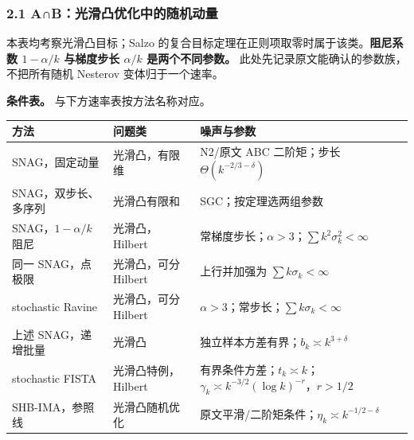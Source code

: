 \documentclass[
  chinese,
  10pt,
  a4paper,
]{article}
\newcounter{none} %
\begin{document}
\subsubsection{2.1
A∩B：光滑凸优化中的随机动量}\label{abux5149ux6ed1ux51f8ux4f18ux5316ux4e2dux7684ux968fux673aux52a8ux91cf}

本表均考察光滑凸目标；Salzo
的复合目标定理在正则项取零时属于该类。\textbf{阻尼系数 \(1-\alpha/k\)
与梯度步长 \(\alpha/k\) 是两个不同参数。}
此处先记录原文能确认的参数族，不把所有随机 Nesterov 变体归于一个速率。

\textbf{条件表。} 与下方速率表按方法名称对应。

{\def\LTcaptype{none} %
\begin{longtable}[]{@{}
  >{\raggedright\arraybackslash}p{}
  >{\raggedright\arraybackslash}p{}
  >{\raggedright\arraybackslash}p{}@{}}
\toprule\noalign{}
\begin{minipage}[b]{\linewidth}\raggedright
方法
\end{minipage} & \begin{minipage}[b]{\linewidth}\raggedright
问题类
\end{minipage} & \begin{minipage}[b]{\linewidth}\raggedright
噪声与参数
\end{minipage} \\
\midrule\noalign{}
\endhead
\bottomrule\noalign{}
\endlastfoot
SNAG，固定动量 & 光滑凸，有限维 & N2/原文 ABC 二阶矩；步长
\(\Theta(k^{-2/3-\delta})\) \\
SNAG，双步长、多序列 & 光滑凸有限和 & SGC；按定理选两组参数 \\
SNAG，\(1-\alpha/k\) 阻尼 & 光滑凸，Hilbert &
常梯度步长；\(\alpha>3\)；\(\sum k^2\sigma_k^2<\infty\) \\
同一 SNAG，点极限 & 光滑凸，可分 Hilbert & 上行并加强为
\(\sum k\sigma_k<\infty\) \\
stochastic Ravine & 光滑凸，可分 Hilbert &
\(\alpha>3\)；常步长；\(\sum k\sigma_k<\infty\) \\
上述 SNAG，递增批量 & 光滑凸 &
独立样本方差有界；\(b_k\asymp k^{3+\delta}\) \\
stochastic FISTA & 光滑凸特例，Hilbert &
有界条件方差；\(t_k\asymp k\)；\(\gamma_k\asymp k^{-3/2}(\log k)^{-r}\)，\(r>1/2\) \\
SHB-IMA，参照线 & 光滑凸随机优化 &
原文平滑/二阶矩条件；\(\eta_k\asymp k^{-1/2-\delta}\) \\
\end{longtable}
}
\end{document}
